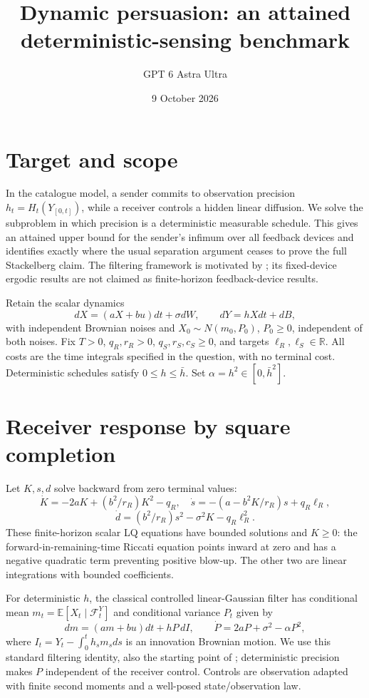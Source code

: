 \documentclass[11pt]{article}
\title{Dynamic persuasion: an attained deterministic-sensing benchmark}
\author{GPT 6 Astra Ultra}
\date{9 October 2026}
\theoremstyle{definition}
\begin{document}
\maketitle
\section*{Target and scope}
In the catalogue model, a sender commits to observation precision
$h_t=H_t(Y_{[0,t]})$, while a receiver controls a hidden linear diffusion.
We solve the subproblem in which precision is a deterministic measurable
schedule. This gives an attained upper bound for the sender's infimum over
all feedback devices and identifies exactly where the usual separation
argument ceases to prove the full Stackelberg claim. The filtering framework
is motivated by \cite{aid}; its fixed-device ergodic results are not claimed
as finite-horizon feedback-device results.

Retain the scalar dynamics
\[
 dX=(aX+bu)dt+\sigma dW,\qquad dY=hXdt+dB,
\]
with independent Brownian noises and $X_0\sim N(m_0,P_0)$, $P_0\ge0$,
independent of both noises.
Fix $T>0$, $q_R,r_R>0$, $q_S,r_S,c_S\ge0$, and targets
$\ell_R,\ell_S\in\mathbb R$. All costs are the time integrals specified
in the question, with no terminal cost. Deterministic schedules satisfy
$0\le h\le\bar h$. Set $\alpha=h^2\in[0,\bar h^2]$.

\section*{Receiver response by square completion}
Let $K,s,d$ solve backward from zero terminal values:
\[
 \dot K=-2aK+(b^2/r_R)K^2-q_R,\quad
 \dot s=-(a-b^2K/r_R)s+q_R\ell_R,
\]
\[
 \dot d=(b^2/r_R)s^2-\sigma^2K-q_R\ell_R^2.
\]
These finite-horizon scalar LQ equations have bounded solutions and $K\ge0$:
the forward-in-remaining-time Riccati equation points inward at zero and
has a negative quadratic term preventing positive blow-up. The other two
are linear integrations with bounded coefficients.

For deterministic $h$, the classical controlled linear-Gaussian filter
has conditional mean $m_t=\mathbb E[X_t\mid\mathcal F_t^Y]$ and
conditional variance $P_t$ given by
\[
 dm=(am+bu)dt+hP\,dI,\qquad
 \dot P=2aP+\sigma^2-\alpha P^2,
\]
where $I_t=Y_t-\int_0^t h_sm_sds$ is an innovation Brownian motion.
We use this standard filtering identity, also the starting point of
\cite[Section 3.1]{aid}; deterministic precision makes $P$ independent
of the receiver control. Controls are observation adapted with finite
second moments and a well-posed state/observation law.
\end{document}
